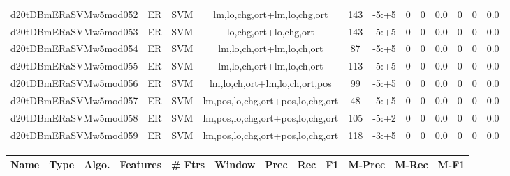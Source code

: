 \documentclass[a4paper]{article}
\begin{document}
\begin{landscape}
\begin{center}
\begin{tabular}{ |c|c|c|c|c|c|c|c|c|c|c|c|}
 
 	
 	\small{ d20tDBmERaSVMw5mod052 } & ER & SVM & lm,lo,chg,ort+lm,lo,chg,ort  &  143 &  -5:+5  &  0 & 0 & 0.0  &  0 & 0 & 0.0 \\
 	

 
 	
 	\small{ d20tDBmERaSVMw5mod053 } & ER & SVM & lo,chg,ort+lo,chg,ort  &  143 &  -5:+5  &  0 & 0 & 0.0  &  0 & 0 & 0.0 \\
 	

 
 	
 	\small{ d20tDBmERaSVMw5mod054 } & ER & SVM & lm,lo,ch,ort+lm,lo,ch,ort  &  87 &  -5:+5  &  0 & 0 & 0.0  &  0 & 0 & 0.0 \\
 	

 
 	
 	\small{ d20tDBmERaSVMw5mod055 } & ER & SVM & lm,lo,ch,ort+lm,lo,ch,ort  &  113 &  -5:+5  &  0 & 0 & 0.0  &  0 & 0 & 0.0 \\
 	

 
 	
 	\small{ d20tDBmERaSVMw5mod056 } & ER & SVM & lm,lo,ch,ort+lm,lo,ch,ort,pos  &  99 &  -5:+5  &  0 & 0 & 0.0  &  0 & 0 & 0.0 \\
 	

 
 	
 	\small{ d20tDBmERaSVMw5mod057 } & ER & SVM & lm,pos,lo,chg,ort+pos,lo,chg,ort  &  48 &  -5:+5  &  0 & 0 & 0.0  &  0 & 0 & 0.0 \\
 	

 
 	
 	\small{ d20tDBmERaSVMw5mod058 } & ER & SVM & lm,pos,lo,chg,ort+pos,lo,chg,ort  &  105 &  -5:+2  &  0 & 0 & 0.0  &  0 & 0 & 0.0 \\
 	

 
 	
 	\small{ d20tDBmERaSVMw5mod059 } & ER & SVM & lm,pos,lo,chg,ort+pos,lo,chg,ort  &  118 &  -3:+5  &  0 & 0 & 0.0  &  0 & 0 & 0.0 \\
 	
 \hline
\end{tabular}
\end{center}




\begin{center}
\begin{tabular}{ |c|c|c|c|c|c|c|c|c|c|c|c|} 
 \hline
 	Name & Type & Algo. & Features & \# Ftrs & Window & Prec & Rec & F1 & M-Prec & M-Rec & M-F1\\
 \hline

 	

 
 	

\end{tabular}
\end{center}
\end{landscape}
\end{document}
